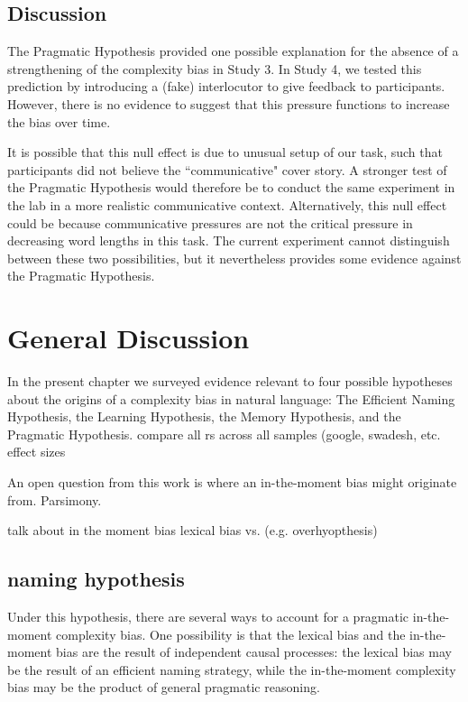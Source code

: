 \subsection{Discussion}
The Pragmatic Hypothesis provided one possible explanation for the absence of a strengthening of the complexity bias in Study 3. In Study 4, we tested this prediction by introducing a (fake) interlocutor to give feedback to participants. However, there is no evidence to suggest that this pressure functions to  increase the bias over time.

It is possible that this null effect is due to unusual setup of our task, such that participants did not believe the ``communicative" cover story.  A stronger test of the Pragmatic Hypothesis would therefore be to conduct the same experiment in the lab in a more realistic communicative context. Alternatively, this null effect could be because communicative pressures are not the critical pressure in decreasing word lengths in this task. The current experiment cannot distinguish between these two possibilities, but it nevertheless provides some evidence against the Pragmatic Hypothesis.

\section{General Discussion }
In the present chapter we surveyed evidence relevant to four possible hypotheses about the origins of a complexity bias in natural language: The Efficient Naming Hypothesis, the Learning Hypothesis, the Memory Hypothesis, and the Pragmatic Hypothesis.
compare all rs across all samples (google, swadesh, etc.
effect sizes

An open question from this work is where an in-the-moment bias might originate from. Parsimony.

talk about in the moment bias  lexical bias vs. (e.g. overhyopthesis)

\subsection{naming hypothesis}
Under this hypothesis, there are several ways to account for a pragmatic in-the-moment complexity bias. One possibility is that the lexical bias and the in-the-moment bias are the result of independent causal processes: the lexical bias may be the result of an efficient naming strategy, while the in-the-moment complexity bias may be the product of  general pragmatic reasoning. 

